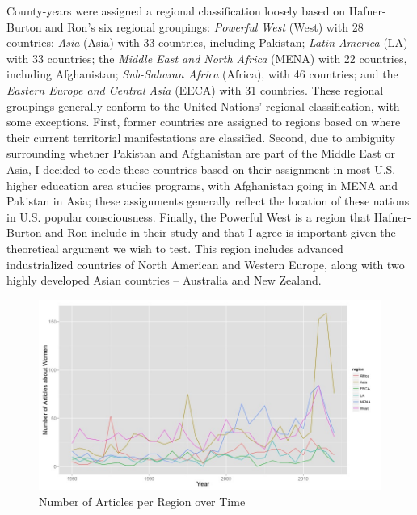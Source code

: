 \documentclass[11pt, oneside]{article}
\begin{document}
County-years were assigned a regional classification loosely based on Hafner-Burton and Ron's \citeyear{hafner2013} six regional groupings: \emph{Powerful West} (West) with 28 countries; \emph{Asia} (Asia) with 33 countries, including Pakistan; \emph{Latin America} (LA) with 33 countries; the \emph{Middle East and North Africa} (MENA) with 22 countries, including Afghanistan; \emph{Sub-Saharan Africa} (Africa), with 46 countries; and the \emph{Eastern Europe and Central Asia} (EECA) with 31 countries. These regional groupings generally conform to the United Nations' regional classification, with some exceptions. First, former countries are assigned to regions based on where their current territorial manifestations are classified. Second, due to ambiguity surrounding whether Pakistan and Afghanistan are part of the Middle East or Asia, I decided to code these countries based on their assignment in most U.S. higher education area studies programs, with Afghanistan going in MENA and Pakistan in Asia; these assignments generally reflect the location of these nations in U.S. popular consciousness. Finally, the Powerful West is a region that Hafner-Burton and Ron include in their study and that I agree is important given the theoretical argument we wish to test. This region includes advanced industrialized countries of North American and Western Europe, along with two highly developed Asian countries -- Australia and New Zealand. 

\begin{figure}[h]
\includegraphics[scale=0.55]{n-region-plot}
\caption{Number of Articles per Region over Time}\label{fig:n-region}
\end{figure}
\end{document}
